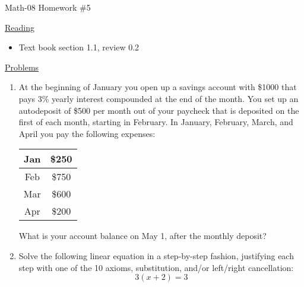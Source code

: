 \documentclass[letterpaper,12pt,fleqn]{article}
\begin{document}
\begin{center}
\Large Math-08 Homework \#5
\end{center}

\vspace{0.5in}

\underline{Reading}

\begin{itemize}
\item Text book section 1.1, review 0.2
\end{itemize}

\underline{Problems}

\begin{enumerate}
\item At the beginning of January you open up a savings account with \$1000
  that pays 3\% yearly interest compounded at the end of the month. You set up
  an autodeposit of \$500 per month out of your paycheck that is deposited on
  the first of each month, starting in February. In January, February, March,
  and April you pay the following expenses:
  
  \begin{tabular}{|c|c|}
    \hline
    Jan & \$250 \\
    \hline
    Feb & \$750 \\
    \hline
    Mar & \$600 \\
    \hline
    Apr & \$200 \\
    \hline
  \end{tabular}
  
  What is your account balance on May 1, after the monthly deposit?

  \bigskip

\item Solve the following linear equation in a step-by-step fashion, justifying
  each step with one of the 10 axioms, substitution, and/or left/right
  cancellation:
  \[3(x+2)=3\]
\end{enumerate}
  
\end{document}
